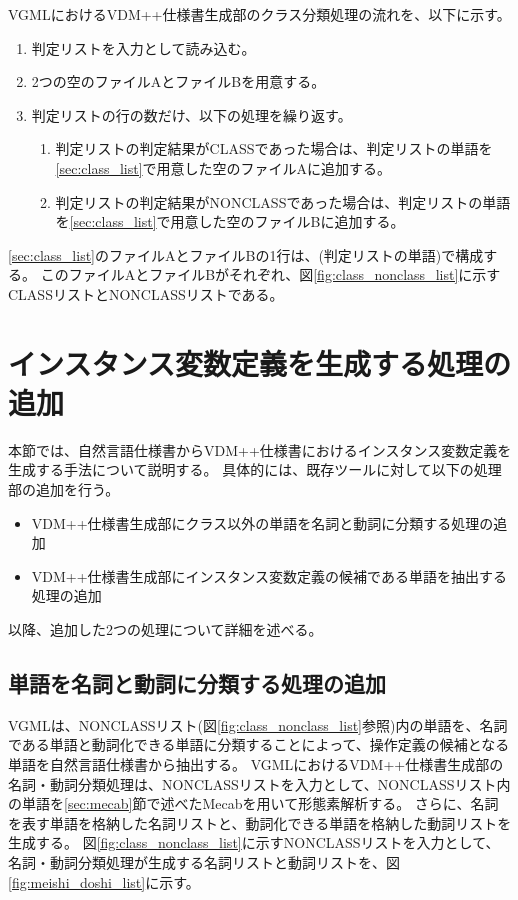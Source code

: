 VGMLにおけるVDM++仕様書生成部のクラス分類処理の流れを、以下に示す。

\begin{enumerate}
    \item 判定リストを入力として読み込む。
    \item 2つの空のファイルAとファイルBを用意する。
    \label{sec:class_list}
    \item 判定リストの行の数だけ、以下の処理を繰り返す。
        \begin{enumerate}
            \item 判定リストの判定結果がCLASSであった場合は、判定リストの単語を\ref{sec:class_list}で用意した空のファイルAに追加する。
            \item 判定リストの判定結果がNONCLASSであった場合は、判定リストの単語を\ref{sec:class_list}で用意した空のファイルBに追加する。
        \end{enumerate}
\end{enumerate}

\ref{sec:class_list}のファイルAとファイルBの1行は、(判定リストの単語)で構成する。
このファイルAとファイルBがそれぞれ、図\ref{fig:class_nonclass_list}に示すCLASSリストとNONCLASSリストである。

\section{インスタンス変数定義を生成する処理の追加}
\label{sec:instance_generate}
本節では、自然言語仕様書からVDM++仕様書におけるインスタンス変数定義を生成する手法について説明する。
具体的には、既存ツールに対して以下の処理部の追加を行う。

\begin{itemize}
    \item VDM++仕様書生成部にクラス以外の単語を名詞と動詞に分類する処理の追加
    \item VDM++仕様書生成部にインスタンス変数定義の候補である単語を抽出する処理の追加
\end{itemize}

以降、追加した2つの処理について詳細を述べる。

\subsection{単語を名詞と動詞に分類する処理の追加}
\label{sec:classifier_meishi}
VGMLは、NONCLASSリスト(図\ref{fig:class_nonclass_list}参照)内の単語を、名詞である単語と動詞化できる単語に分類することによって、操作定義の候補となる単語を自然言語仕様書から抽出する。
VGMLにおけるVDM++仕様書生成部の名詞・動詞分類処理は、NONCLASSリストを入力として、NONCLASSリスト内の単語を\ref{sec:mecab}節で述べたMecabを用いて形態素解析する。
さらに、名詞を表す単語を格納した名詞リストと、動詞化できる単語を格納した動詞リストを生成する。
図\ref{fig:class_nonclass_list}に示すNONCLASSリストを入力として、名詞・動詞分類処理が生成する名詞リストと動詞リストを、図\ref{fig:meishi_doshi_list}に示す。

